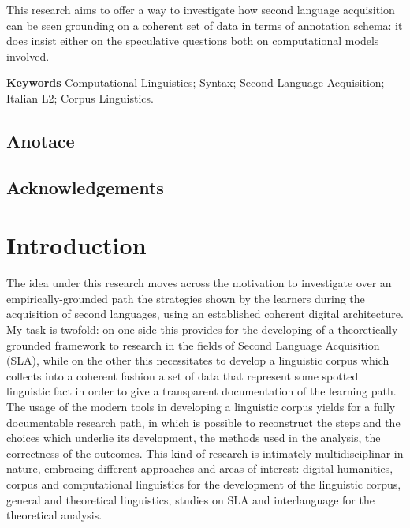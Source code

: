 \documentclass[
  a4paper,
  twoside,
  12pt,
  chapterprefix=false,
  bibliography=totocnumbered,
  listof=flat]{scrbook}
\begin{document}
This research aims to offer a way to investigate how second language acquisition can be seen grounding on a coherent set of data in terms of annotation schema: it does insist either on the speculative questions both on computational models involved.

\textbf{Keywords}
Computational Linguistics; Syntax; Second Language Acquisition; Italian L2; Corpus Linguistics.

\newpage

\hypertarget{anotace}{%
\section*{Anotace}\label{anotace}}

\newpage

\hypertarget{acknowledgements}{%
\section*{Acknowledgements}\label{acknowledgements}}

\mainmatter

\hypertarget{introduction}{%
\chapter{Introduction}\label{introduction}}

The idea under this research moves across the motivation to investigate over an empirically-grounded path the strategies shown by the learners during the acquisition of second languages, using an established coherent digital architecture.
My task is twofold: on one side this provides for the developing of a theoretically-grounded framework to research in the fields of Second Language Acquisition (SLA), while on the other this necessitates to develop a linguistic corpus which collects into a coherent fashion a set of data that represent some spotted linguistic fact in order to give a transparent documentation of the learning path.
The usage of the modern tools in developing a linguistic corpus yields for a fully documentable research path, in which is possible to reconstruct the steps and the choices which underlie its development, the methods used in the analysis, the correctness of the outcomes.
This kind of research is intimately multidisciplinar in nature, embracing different approaches and areas of interest: digital humanities, corpus and computational linguistics for the development of the linguistic corpus, general and theoretical linguistics, studies on SLA and interlanguage for the theoretical analysis.
\end{document}
